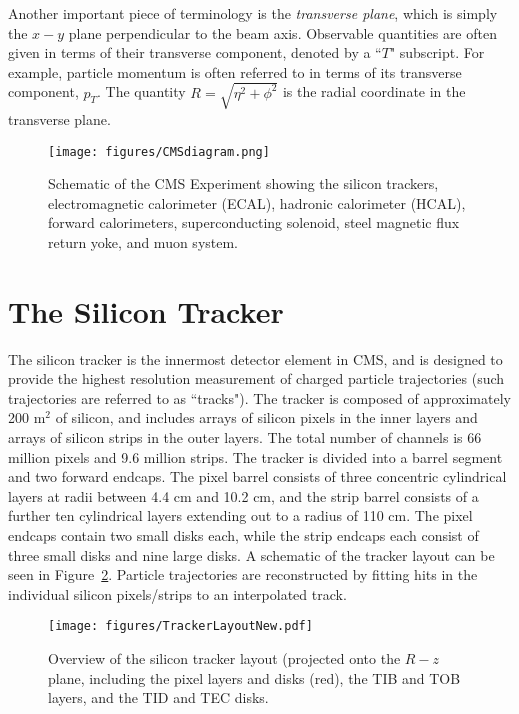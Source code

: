 \noindent Another important piece of terminology is the \textit{transverse plane}, which is simply the $x-y$ plane perpendicular to the beam axis. Observable quantities are often given in terms of their transverse component, denoted by a ``$T$" subscript. For example, particle momentum is often referred to in terms of its transverse component, $p_T$. The quantity $R = \sqrt{\eta^2 + \phi^2}$ is the radial coordinate in the transverse plane.
 
\begin{figure}\centering
  \texttt{[image: figures/CMSdiagram.png]}
  \caption{\label{fig:CMSdiagram} Schematic of the CMS Experiment showing the silicon trackers, electromagnetic calorimeter (ECAL), hadronic calorimeter (HCAL), forward calorimeters, superconducting solenoid, steel magnetic flux return yoke, and muon system.}
\end{figure}

\section{The Silicon Tracker}

The silicon tracker is the innermost detector element in CMS, and is designed to provide the highest resolution measurement of charged particle trajectories (such trajectories are referred to as ``tracks"). The tracker is composed of approximately 200 m$^{2}$ of silicon, and includes arrays of silicon pixels in the inner layers and arrays of silicon strips in the outer layers. The total number of channels is 66 million pixels and 9.6 million strips\cite{TDR}. The tracker is divided into a barrel segment and two forward endcaps. The pixel barrel consists of three concentric cylindrical layers at radii between 4.4 cm and 10.2 cm, and the strip barrel consists of a further ten cylindrical layers extending out to a radius of 110 cm. The pixel endcaps contain two small disks each, while the strip endcaps each consist of three small disks and nine large disks. A schematic of the tracker layout can be seen in Figure~\ref{fig:TrackerLayout}. Particle trajectories are reconstructed by fitting hits in the individual silicon pixels/strips to an interpolated track.

\begin{figure}\centering
  \texttt{[image: figures/TrackerLayoutNew.pdf]}
  \caption{\label{fig:TrackerLayout} Overview of the silicon tracker layout (projected onto the $R-z$ plane, including the pixel layers and disks (red), the TIB and TOB layers, and the TID and TEC disks.}
\end{figure}


